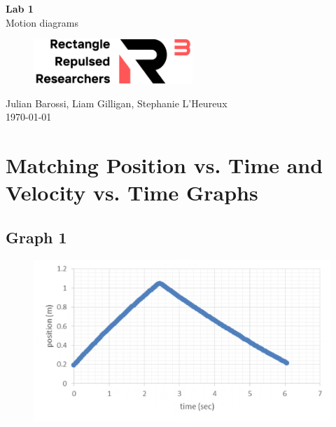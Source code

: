 \documentclass[11pt, letterpaper, includehead]{article}
\begin{document}
  \begin{titlepage} 
    \begin{center}
      \Huge{\textbf{Lab 1}}\\
      \Huge{Motion diagrams}
      \vfill
      \begin{figure}[H] %
        \centering 
        \includegraphics[width=6cm]{r_cubed_logo.png}
      \end{figure}
      \large{Julian Barossi, Liam Gilligan, Stephanie L'Heureux}\\
      \vspace{0.5cm}
      \normalsize
      \today
    \end{center}
  \end{titlepage}

  \tableofcontents
  \pagebreak %


  \pagestyle{fancy}
  \fancyhead{}

  
  \setcounter{section}{2} %
  \section{Matching Position vs. Time and Velocity vs. Time Graphs}

  \subsection{Graph 1}

  \begin{figure}[H] %
    \centering 
    \includegraphics[width=\linewidth]{graph_1.png}
  \end{figure}
\end{document}
